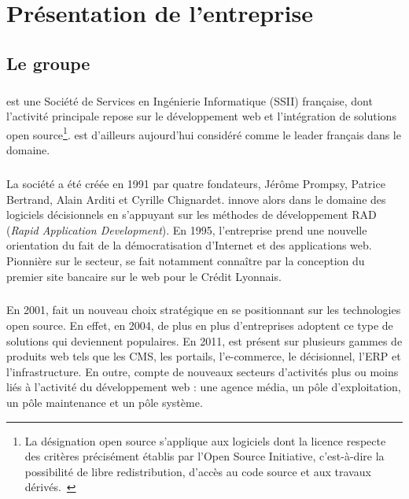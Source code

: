 \chapter{Présentation de l'entreprise}

\section{Le groupe \asmile}

\paragraph{}
\asmile{} est une Société de Services en Ingénierie Informatique (SSII) française, dont l'activité principale repose sur le développement web et l'intégration de solutions open source\footnote{La désignation open source s'applique aux logiciels dont la licence respecte des critères précisément établis par l'Open Source Initiative, c'est-à-dire la possibilité de libre redistribution, d'accès au code source et aux travaux dérivés.~\cite{opensource}}.
\asmile{} est d'ailleurs aujourd'hui considéré comme le leader français dans le domaine.

\paragraph{}
La société a été créée en 1991 par quatre fondateurs, Jérôme Prompsy, Patrice Bertrand, Alain Arditi et Cyrille Chignardet.
\asmile{} innove alors dans le domaine des logiciels décisionnels en s'appuyant sur les méthodes de développement RAD (\textit{Rapid Application Development}).
En 1995, l'entreprise prend une nouvelle orientation du fait de la démocratisation d'Internet et des applications web.
Pionnière sur le secteur, \asmile{} se fait notamment connaître par la conception du premier site bancaire sur le web pour le Crédit Lyonnais.

\paragraph{}
En 2001, \asmile{} fait un nouveau choix stratégique en se positionnant sur les technologies open source.
En effet, en 2004, de plus en plus d'entreprises adoptent ce type de solutions qui deviennent populaires.
En 2011, \asmile{} est présent sur plusieurs gammes de produits web tels que les CMS, les portails, l'e-commerce, le décisionnel, l'ERP et l'infrastructure.
En outre, \asmile{} compte de nouveaux secteurs d'activités plus ou moins liés à l'activité du développement web : une agence média, un pôle d'exploitation, un pôle maintenance et un pôle système.

